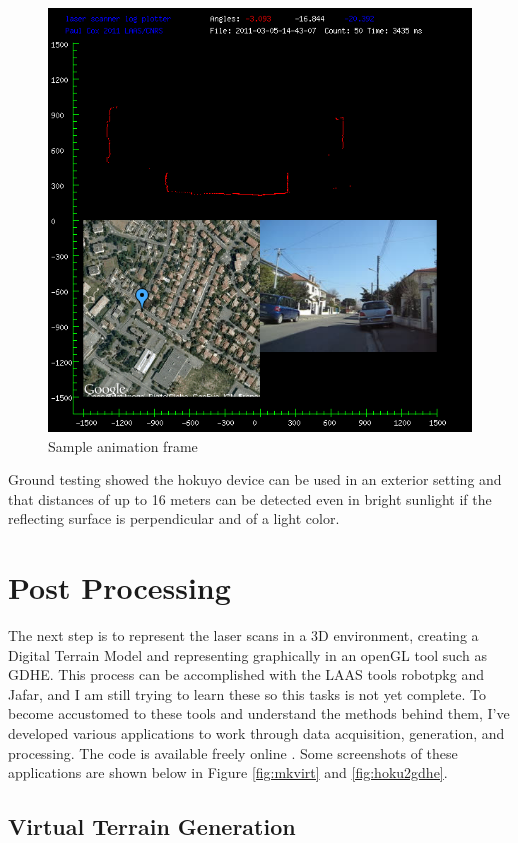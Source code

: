 \documentclass[a4paper,11pt]{report}
\begin{document}
\begin{figure}[ht]
 \centering
 \includegraphics[width=12cm]{Plotlogsample.png}
 \caption{Sample animation frame}
 \label{fig:plotlogsample}
\end{figure}

Ground testing showed the hokuyo device can be used in an exterior setting and that distances of up to 16 meters can be detected even in bright sunlight if the reflecting surface is perpendicular and of a light color.

\section{Post Processing}

The next step is to represent the laser scans in a 3D environment, creating a Digital Terrain Model and representing graphically in an openGL tool such as GDHE. This process can be accomplished with the LAAS tools robotpkg and Jafar, and I am still trying to learn these so this tasks is not yet complete. To become accustomed to these tools and understand the methods behind them, I've developed various applications to work through data acquisition, generation, and processing. The code is available freely online \cite{laserhawkgit}. Some screenshots of these applications are shown below in Figure \ref{fig:mkvirt} and \ref{fig:hoku2gdhe}.

\subsection{Virtual Terrain Generation}
\end{document}
